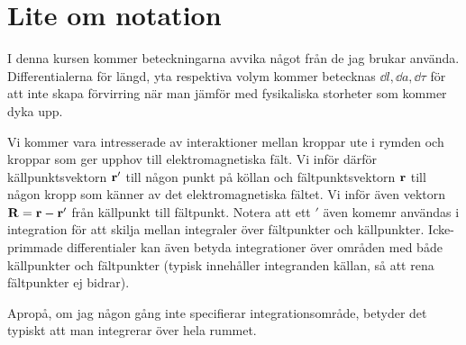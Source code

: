 \section{Lite om notation}

I denna kursen kommer beteckningarna avvika något från de jag brukar använda. Differentialerna för längd, yta respektiva volym kommer betecknas $\dd{l}, \dd{a}, \dd{\tau}$ för att inte skapa förvirring när man jämför med fysikaliska storheter som kommer dyka upp.

Vi kommer vara intresserade av interaktioner mellan kroppar ute i rymden och kroppar som ger upphov till elektromagnetiska fält. Vi inför därför källpunktsvektorn $\vb{r}'$ till någon punkt på köllan och fältpunktsvektorn $\vb{r}$ till någon kropp som känner av det elektromagnetiska fältet. Vi inför även vektorn $\vb{R} = \vb{r} - \vb{r}'$ från källpunkt till fältpunkt. Notera att ett $'$ även komemr användas i integration för att skilja mellan integraler över fältpunkter och källpunkter. Icke-primmade differentialer kan även betyda integrationer över områden med både källpunkter och fältpunkter (typisk innehåller integranden källan, så att rena fältpunkter ej bidrar).

Apropå, om jag någon gång inte specifierar integrationsområde, betyder det typiskt att man integrerar över hela rummet.
